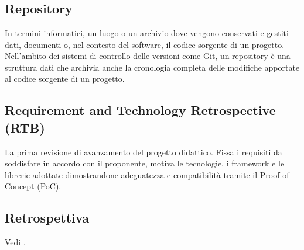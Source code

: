 \newpage



\section{}

\subsection*{Repository}
In termini informatici, un luogo o un archivio dove vengono conservati e gestiti dati, documenti o, nel contesto del software, il codice sorgente di un 
progetto. Nell'ambito dei sistemi di controllo delle versioni come Git, un repository è una struttura dati che archivia anche la cronologia completa delle 
modifiche apportate al codice sorgente di un progetto.

\subsection*{Requirement and Technology Retrospective (RTB)}
La prima revisione di avanzamento del progetto didattico. Fissa i requisiti da soddisfare in accordo con il proponente, motiva le tecnologie, i framework 
e le librerie adottate dimostrandone adeguatezza e compatibilità tramite il Proof of Concept (PoC).

\subsection*{Retrospettiva}
Vedi .

\newpage